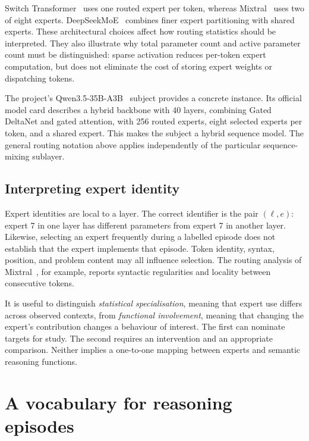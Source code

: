 \documentclass[12pt,a4paper,twoside,openright]{book}
\begin{document}
Switch Transformer~\cite{fedus2022switch} uses one routed expert per token,
whereas Mixtral~\cite{jiang2024mixtral} uses two of eight experts.
DeepSeekMoE~\cite{dai2024deepseekmoe} combines finer expert partitioning with
shared experts. These architectural choices affect how routing
statistics should be interpreted. They also illustrate why total parameter
count and active parameter count must be distinguished: sparse activation
reduces per-token expert computation, but does not eliminate the cost of
storing expert weights or dispatching tokens.

The project's Qwen3.5-35B-A3B~\cite{qwen2026qwen35} subject provides a concrete
instance. Its official model card describes a hybrid backbone with 40 layers,
combining Gated DeltaNet and gated attention, with 256 routed experts, eight
selected experts per token, and a shared expert. This makes the subject
a hybrid sequence model. The general routing notation above applies
independently of the particular sequence-mixing sublayer.

\subsection{Interpreting expert identity}

Expert identities are local to a layer. The correct identifier is the pair
$(\ell,e)$: expert 7 in one layer has different parameters from expert 7 in
another layer. Likewise, selecting an expert frequently during a labelled
episode does not establish that the expert implements that episode.
Token identity, syntax, position, and problem content may all influence
selection. The routing analysis of Mixtral~\cite{jiang2024mixtral}, for
example, reports syntactic regularities and locality between consecutive tokens.

It is useful to distinguish \emph{statistical specialisation}, meaning that
expert use differs across observed contexts, from \emph{functional
involvement}, meaning that changing the expert's contribution changes a
behaviour of interest. The first can nominate targets for study. The second
requires an intervention and an appropriate comparison. Neither implies a
one-to-one mapping between experts and semantic reasoning functions.

\section{A vocabulary for reasoning episodes}
\label{sec:episode-framework}
\end{document}
